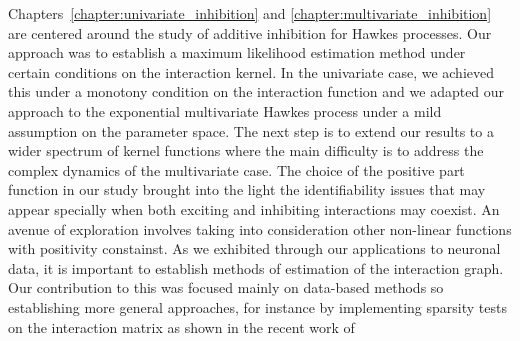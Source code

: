 Chapters~\ref{chapter:univariate_inhibition} and \ref{chapter:multivariate_inhibition} are centered around the study of additive inhibition for Hawkes processes.
Our approach was to establish a maximum likelihood estimation method under certain conditions on the interaction kernel. 
In the univariate case, we achieved this under a monotony condition on the interaction function and we adapted our approach to the exponential multivariate Hawkes process under a mild assumption on the parameter space.
The next step is to extend our results to a wider spectrum of kernel functions where the main difficulty is to address the complex dynamics of the multivariate case.
The choice of the positive part function in our study brought into the light the identifiability issues that may appear specially when both exciting and inhibiting interactions may coexist.
An avenue of exploration involves taking into consideration other non-linear functions with positivity constainst.
As we exhibited through our applications to neuronal data, it is important to establish methods of estimation of the interaction graph.
Our contribution to this was focused mainly on data-based methods so establishing more general approaches, for instance by implementing sparsity tests on the interaction matrix as shown in the recent work of \textcite{Lotz2024}
